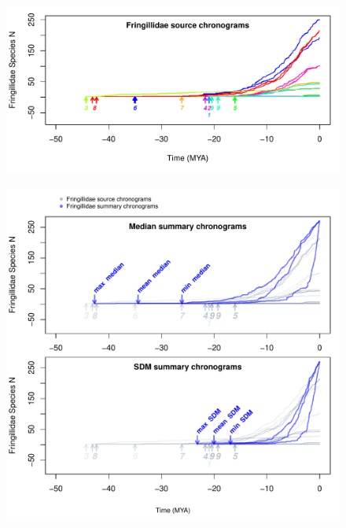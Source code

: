 \documentclass[]{article}
\begin{document}
\newpage

\begin{figure}[!h]
\includegraphics[width=1\linewidth]{fig_schronograms1.pdf}
\caption{}
\label{fig:schronograms1}
\end{figure}

\newpage

\begin{figure}[!h]
\includegraphics{fig_summaries.pdf}
\caption{}
\label{fig:summaries}
\end{figure}

\newpage
\end{document}
